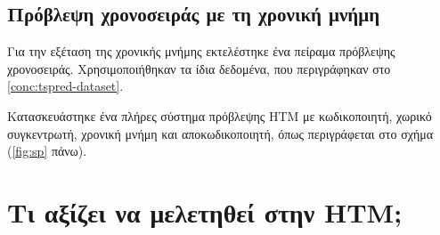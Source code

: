 \subsection{Πρόβλεψη χρονοσειράς με τη χρονική μνήμη}

	Για την εξέταση της χρονικής μνήμης εκτελέστηκε ένα πείραμα πρόβλεψης χρονοσειράς.
	Χρησιμοποιήθηκαν τα ίδια δεδομένα, που περιγράφηκαν στο \ref{conc:tspred-dataset}.

	Κατασκευάστηκε ένα πλήρες σύστημα πρόβλεψης HTM με κωδικοποιητή, χωρικό συγκεντρωτή, χρονική μνήμη και αποκωδικοποιητή,
	όπως περιγράφεται στο σχήμα (\ref{fig:sp} πάνω).



\section{Τι αξίζει να μελετηθεί στην HTM;} \label{conc:study-suggestions}
